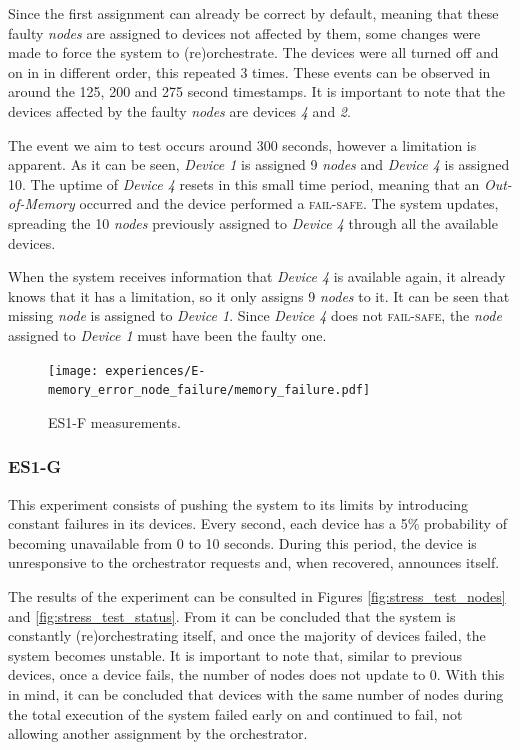 Since the first assignment can already be correct by default, meaning that these faulty \textit{nodes} are assigned to devices not affected by them, some changes were made to force the system to (re)orchestrate. The devices were all turned off and on in in different order, this repeated 3 times. These events can be observed in  around the 125, 200 and 275 second timestamps. It is important to note that the devices affected by the faulty \textit{nodes} are devices \textit{4} and \textit{2}.

The event we aim to test occurs around 300 seconds, however a limitation is apparent. As it can be seen, \textit{Device 1} is assigned 9 \textit{nodes} and \textit{Device 4} is assigned 10. The uptime of \textit{Device 4} resets in this small time period, meaning that an \textit{Out-of-Memory} occurred and the device performed a \textsc{fail-safe}. The system updates, spreading the 10 \textit{nodes} previously assigned to \textit{Device 4} through all the available devices. 

When the system receives information that \textit{Device 4} is available again, it already knows that it has a limitation, so it only assigns 9 \textit{nodes} to it. It can be seen that missing \textit{node} is assigned to \textit{Device 1}. Since \textit{Device 4} does not \textsc{fail-safe}, the \textit{node} assigned to \textit{Device 1} must have been the faulty one.

\begin{figure}[h]
\centering
\texttt{[image: experiences/E-memory\_error\_node\_failure/memory\_failure.pdf]}
\caption[ES1-F measurements]{ES1-F measurements.}\label{fig:experiment_e_graph}
\end{figure}


\subsubsection{ES1-G}\label{sec:experiment_f}

This experiment consists of pushing the system to its limits by introducing constant failures in its devices. Every second, each device has a 5\% probability of becoming unavailable from 0 to 10 seconds. During this period, the device is unresponsive to the orchestrator requests and, when recovered, announces itself.

The results of the experiment can be consulted in Figures \ref{fig:stress_test_nodes} and \ref{fig:stress_test_status}. From  it can be concluded that the system is constantly (re)orchestrating itself, and once the majority of devices failed, the system becomes unstable. It is important to note that, similar to previous devices, once a device fails, the number of nodes does not update to 0. With this in mind, it can be concluded that devices with the same number of nodes during the total execution of the system failed early on and continued to fail, not allowing another assignment by the orchestrator.

